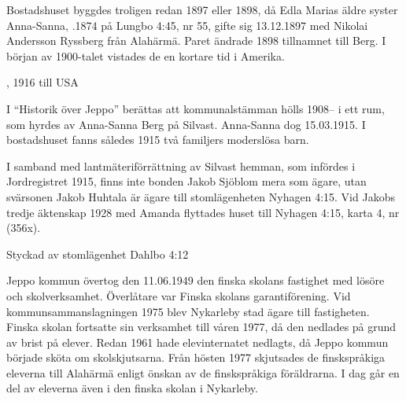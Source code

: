 Bostadshuset byggdes troligen redan 1897 eller 1898, då Edla Marias äldre syster Anna-Sanna, .1874 på Lungbo 4:45, nr 55,	gifte sig 13.12.1897 med Nikolai Andersson Ryssberg från Alahärmä.	Paret ändrade 1898 tillnamnet till Berg. I början av 1900-talet vistades de en kortare tid i Amerika.
\begin{jhchildren}
  \item {}, 1916 till USA
  \item {}
  \item {}
  \item {}
\end{jhchildren}
I ``Historik över Jeppo'' berättas att kommunalstämman hölls 1908-- i ett rum, som hyrdes av Anna-Sanna Berg på Silvast. Anna-Sanna dog 15.03.1915. I bostadshuset fanns således 1915 två familjers moderslösa barn.

I samband med lantmäteriförrättning av Silvast hemman, som infördes i Jordregistret 1915, finns inte bonden Jakob Sjöblom mera som ägare, utan svärsonen Jakob Huhtala är ägare till stomlägenheten Nyhagen 4:15. Vid Jakobs tredje äktenskap 1928 med Amanda flyttades huset till Nyhagen 4:15, karta 4, nr (356x).




Styckad av stomlägenhet Dahlbo 4:12


Jeppo kommun övertog den 11.06.1949 den finska skolans fastighet med lösöre och skolverksamhet. Överlåtare var Finska skolans garantiförening. Vid kommunsammanslagningen 1975 blev Nykarleby stad ägare till fastigheten. Finska skolan fortsatte sin verksamhet till våren 1977, då den nedlades på grund av brist på elever. Redan 1961 hade elevinternatet nedlagts, då Jeppo kommun började sköta om skolskjutsarna. Från hösten 1977 skjutsades de finskspråkiga eleverna till Alahärmä enligt önskan av de finskspråkiga föräldrarna. I dag går en del av eleverna även i den finska skolan i Nykarleby.

